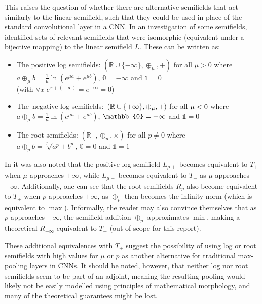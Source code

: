 \documentclass[a4paper, 12pt]{report}
\def\gray#1{\color{gray}#1\color{black}}
\begin{document}
This raises the question of whether there are alternative semifields that act similarly to the linear semifield, such that they could be used in place of the standard convolutional layer in a CNN. In an investigation of some semifields, \cite{bellaardaxiomatic} identified sets of relevant semifields that were isomorphic (equivalent under a bijective mapping) to the linear semifield $L$. These can be written as:

\begin{itemize}
	\item[$L_{\mu+}$]  The positive log semifields:  $(\mathbb{R}\cup \{-\infty\}, \oplus_\mu, +)$ for all $\mu>0$ where \\$a\oplus_\mu b= \frac{1}{\mu}\ln(e^{\mu a}+e^{\mu b})$, $\mathbb{0}=-\infty$ and $\mathbb{1}=0$ 
	\\(with $\forall x\;e^{x+(-\infty)}=e^{-\infty}=0$)
	\item[$L_{\mu-}$]  \gray{The}\ negative \gray{log semifields:\  $(\mathbb{R}\cup \{{\color{black}+\infty}\}, \oplus_\mu, +)$ for all ${\color{black}\mu<0}$ where \\$a\oplus_\mu b= \frac{1}{\mu}\ln(e^{\mu a}+e^{\mu b})$, $\mathbb{0}={\color{black}+\infty}$ and $\mathbb{1}=0$}
	\item[$R_p$]  The root semifields:  $(\mathbb{R}_+, \oplus_p, \times)$ for all $p\ne0$ where \\$a\oplus_p b= \sqrt[p]{a^p+b^p}$, $\mathbb{0}=0$ and $\mathbb{1}=1$
\end{itemize}

\noindent
In \cite{bellaardaxiomatic} it was also noted that the positive log semifield $L_{\mu+}$ becomes equivalent to $T_+$ when $\mu$ approaches $+\infty$, while $L_{\mu-}$ becomes equivalent to $T_-$ as $\mu$ approaches $-\infty$. 
Additionally, one can see that the root semifields $R_p$ also become equivalent to $T_+$ when $p$ approaches $+\infty$, as $\oplus_p$ then becomes the infinity-norm (which is equivalent to $\max$). Informally, the reader may also convince themselves that as $p$ approaches $-\infty$, the semifield addition $\oplus_p$ approximates $\min$, making a theoretical $R_{-\infty}$ equivalent to $T_-$ (out of scope for this report).

These additional equivalences with $T_+$ suggest the possibility of using log or root semifields with high values for $\mu$ or $p$ as another alternative for traditional max-pooling layers in CNNs. It should be noted, however, that neither log nor root semifields seem to be part of an adjoint, meaning the resulting pooling would likely not be easily modelled using principles of mathematical morphology, and many of the theoretical guarantees might be lost.
\end{document}
